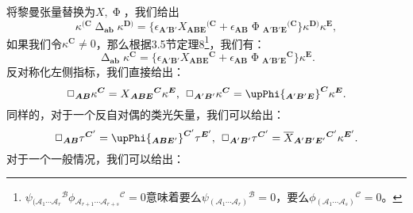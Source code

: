 将黎曼张量替换为$X,\upPhi $，我们给出
\begin{equation*}
	\kappa ^{(\boldsymbol{C}} \upDelta _{\boldsymbol{ab}} \kappa ^{\boldsymbol{D})} =\{\epsilon _{\boldsymbol{A} '\boldsymbol{B} '} X{_{\boldsymbol{ABE}}}^{(\boldsymbol{C}} +\epsilon _{\boldsymbol{AB}} \upPhi {_{\boldsymbol{A} '\boldsymbol{B} '\boldsymbol{E}}}^{(\boldsymbol{C}} \}\kappa ^{\boldsymbol{D})} \kappa ^{\boldsymbol{E}} ,
\end{equation*}
如果我们令$\kappa ^{\boldsymbol{C}} \neq 0$，那么根据3.5节定理8\footnote{$\psi {_{(\mathcal{A}_{1} \cdots \mathcal{A}_{r}}}^{\mathcal{B}} \phi {_{\mathcal{A}_{r+1} \cdots \mathcal{A}_{r+s}}}^{\mathcal{C}} =0$意味着要么$\psi {_{(\mathcal{A}_{1} \cdots \mathcal{A}_{r})}}^{\mathcal{B}} =0$，要么$\phi {_{(\mathcal{A}_{1} \cdots \mathcal{A}_{s})}}^{\mathcal{C}} =0$。}，我们有：
\begin{equation*}
	\upDelta _{\boldsymbol{ab}} \kappa ^{\boldsymbol{C}} =\{\epsilon _{\boldsymbol{A} '\boldsymbol{B} '} X{_{\boldsymbol{ABE}}}^{\boldsymbol{C}} +\epsilon _{\boldsymbol{AB}} \upPhi {_{\boldsymbol{A} '\boldsymbol{B} '\boldsymbol{E}}}^{\boldsymbol{C}} \}\kappa ^{\boldsymbol{E}} .
\end{equation*}
反对称化左侧指标，我们直接给出：
\begin{equation*}
	\Box _{\boldsymbol{AB}} \kappa ^{\boldsymbol{C}} =X{_{\boldsymbol{ABE}}}^{\boldsymbol{C}} \kappa ^{\boldsymbol{E}} ,\kern+0.4em \Box _{\boldsymbol{A} '\boldsymbol{B} '} \kappa ^{\boldsymbol{C}} =\upPhi {_{\boldsymbol{A} '\boldsymbol{B} '\boldsymbol{E}}}^{\boldsymbol{C}} \kappa ^{\boldsymbol{E}} .
\end{equation*}
同样的，对于一个反自对偶的类光矢量，我们可以给出：
\begin{equation*}
	\Box _{\boldsymbol{AB}} \tau ^{\boldsymbol{C} '} =\upPhi {_{\boldsymbol{ABE} '}}^{\boldsymbol{C} '} \tau ^{\boldsymbol{E} '} ,\kern+0.4em \Box _{\boldsymbol{A} '\boldsymbol{B} '} \tau ^{\boldsymbol{C} '} =\overline{X}{_{\boldsymbol{A} '\boldsymbol{B} '\boldsymbol{E} '}}^{\boldsymbol{C} '} \kappa ^{\boldsymbol{E} '} .
\end{equation*}
对于一个一般情况，我们可以给出：
